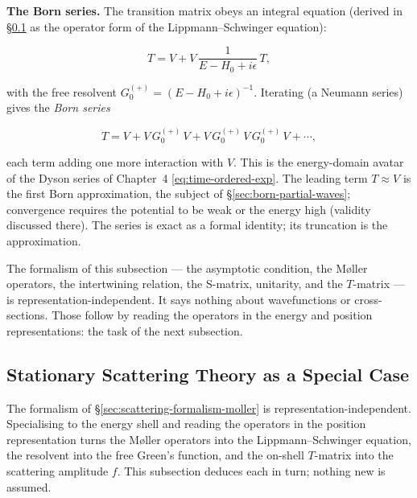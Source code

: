 \medskip\noindent\textbf{The Born series.} The transition matrix obeys an integral equation (derived in \S\ref{sec:scattering-stationary} as the operator form of the Lippmann--Schwinger equation):
\begin{linenomath}
\begin{equation*}
T = V + V\,\frac{1}{E-H_{0}+i\epsilon}\,T,
\end{equation*}
\end{linenomath}
with the free resolvent $G_{0}^{(+)}=(E-H_{0}+i\epsilon)^{-1}$. Iterating (a Neumann series) gives the \emph{Born series}
\begin{linenomath}
\begin{equation}
T = V + V\,G_{0}^{(+)}\,V + V\,G_{0}^{(+)}\,V\,G_{0}^{(+)}\,V + \cdots,
\label{eq:born-series}
\end{equation}
\end{linenomath}
each term adding one more interaction with $V$. This is the energy-domain avatar of the Dyson series of Chapter~4 \eqref{eq:time-ordered-exp}. The leading term $T\approx V$ is the first Born approximation, the subject of \S\ref{sec:born-partial-waves}; convergence requires the potential to be weak or the energy high (validity discussed there). The series is exact as a formal identity; its truncation is the approximation.

The formalism of this subsection --- the asymptotic condition, the M\o{}ller operators, the intertwining relation, the S-matrix, unitarity, and the $T$-matrix --- is representation-independent. It says nothing about wavefunctions or cross-sections. Those follow by reading the operators in the energy and position representations: the task of the next subsection.

\subsection{Stationary Scattering Theory as a Special Case}
\label{sec:scattering-stationary}

The formalism of \S\ref{sec:scattering-formalism-moller} is representation-independent. Specialising to the energy shell and reading the operators in the position representation turns the M\o{}ller operators into the Lippmann--Schwinger equation, the resolvent into the free Green's function, and the on-shell $T$-matrix into the scattering amplitude $f$. This subsection deduces each in turn; nothing new is assumed.

